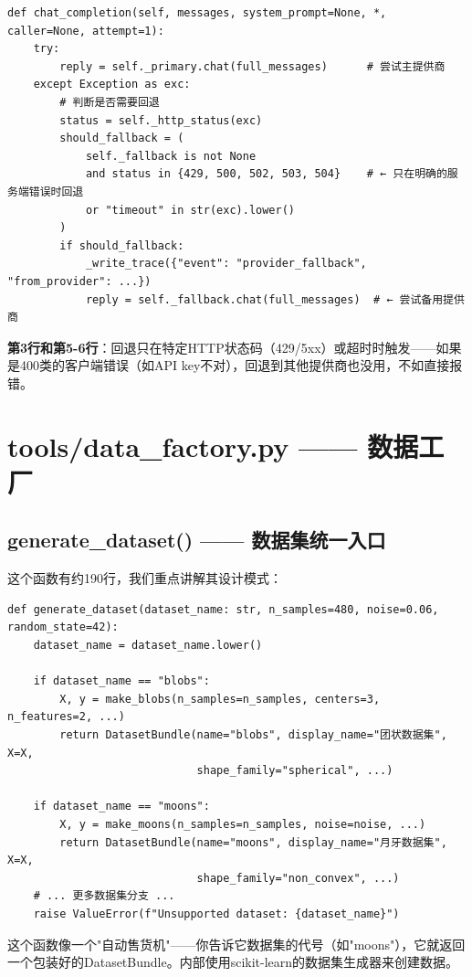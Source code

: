 \documentclass[11pt,a4paper]{ctexbook}
\begin{document}
\begin{verbatim}
def chat_completion(self, messages, system_prompt=None, *, caller=None, attempt=1):
    try:
        reply = self._primary.chat(full_messages)      # 尝试主提供商
    except Exception as exc:
        # 判断是否需要回退
        status = self._http_status(exc)
        should_fallback = (
            self._fallback is not None
            and status in {429, 500, 502, 503, 504}    # ← 只在明确的服务端错误时回退
            or "timeout" in str(exc).lower()
        )
        if should_fallback:
            _write_trace({"event": "provider_fallback", "from_provider": ...})
            reply = self._fallback.chat(full_messages)  # ← 尝试备用提供商
\end{verbatim}

\textbf{第3行和第5-6行}：回退只在特定HTTP状态码（429/5xx）或超时时触发——如果是400类的客户端错误（如API key不对），回退到其他提供商也没用，不如直接报错。

\section{tools/data\_factory.py —— 数据工厂}

\subsection{generate\_dataset() —— 数据集统一入口}

这个函数有约190行，我们重点讲解其设计模式：

\begin{verbatim}
def generate_dataset(dataset_name: str, n_samples=480, noise=0.06, random_state=42):
    dataset_name = dataset_name.lower()

    if dataset_name == "blobs":
        X, y = make_blobs(n_samples=n_samples, centers=3, n_features=2, ...)
        return DatasetBundle(name="blobs", display_name="团状数据集", X=X,
                             shape_family="spherical", ...)

    if dataset_name == "moons":
        X, y = make_moons(n_samples=n_samples, noise=noise, ...)
        return DatasetBundle(name="moons", display_name="月牙数据集", X=X,
                             shape_family="non_convex", ...)
    # ... 更多数据集分支 ...
    raise ValueError(f"Unsupported dataset: {dataset_name}")
\end{verbatim}

\begin{plainbox}
    这个函数像一个"自动售货机"——你告诉它数据集的代号（如"moons"），它就返回一个包装好的DatasetBundle。内部使用scikit-learn的数据集生成器来创建数据。
\end{plainbox}
\end{document}
